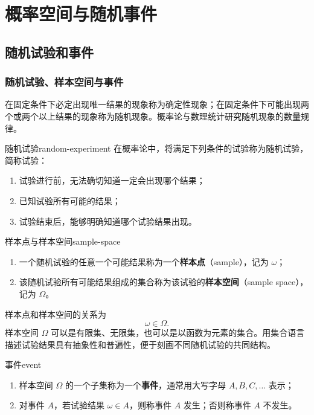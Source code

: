 \setchapterimage{}
\setchapterintro{}
\chapter{概率空间与随机事件}

\section{随机试验和事件}
\label{sec:random-experiment-and-event}

\subsection*{随机试验、样本空间与事件}

在固定条件下必定出现唯一结果的现象称为确定性现象；在固定条件下可能出现两个或两个以上结果的现象称为随机现象。概率论与数理统计研究随机现象的数量规律。

\begin{mydefinition}{随机试验}{random-experiment}
在概率论中，将满足下列条件的试验称为随机试验，简称试验：
\begin{enumerate}
\item 试验进行前，无法确切知道一定会出现哪个结果；
\item 已知试验所有可能的结果；
\item 试验结束后，能够明确知道哪个试验结果出现。
\end{enumerate}
\end{mydefinition}

\begin{mydefinition}{样本点与样本空间}{sample-space}
\begin{enumerate}
\item 一个随机试验的任意一个可能结果称为一个\textbf{样本点}（sample），记为 $\omega$；
\item 该随机试验所有可能结果组成的集合称为该试验的\textbf{样本空间}（sample space），记为 $\Omega$。
\end{enumerate}
\end{mydefinition}

样本点和样本空间的关系为
\[
\omega\in\Omega.
\]
样本空间 $\Omega$ 可以是有限集、无限集，也可以是以函数为元素的集合。用集合语言描述试验结果具有抽象性和普遍性，便于刻画不同随机试验的共同结构。

\begin{mydefinition}{事件}{event}
\begin{enumerate}
\item 样本空间 $\Omega$ 的一个子集称为一个\textbf{事件}，通常用大写字母 $A,B,C,\ldots$ 表示；
\item 对事件 $A$，若试验结果 $\omega\in A$，则称事件 $A$ 发生；否则称事件 $A$ 不发生。
\end{enumerate}
\end{mydefinition}

